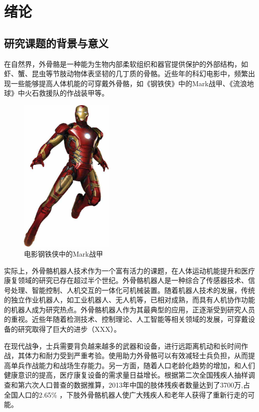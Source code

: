 \chapter{绪论}
\section{研究课题的背景与意义}
在自然界，外骨骼是一种能为生物内部柔软组织和器官提供保护的外部结构，如虾、蟹、昆虫等节肢动物体表坚韧的几丁质的骨骼。近些年的科幻电影中，频繁出现一些能够提高人体机能的可穿戴外骨骼，如《钢铁侠》中的Mark战甲、《流浪地球》中火石救援队的作战装甲等。

\begin{figure}[htb]
    \includegraphics[width=4.5cm]{fig/p2_mark.jpg}
    \caption{电影钢铁侠中的Mark战甲}
    \label{fig:mark}
\end{figure}

实际上，外骨骼机器人技术作为一个富有活力的课题，在人体运动机能提升\cite{p1}和医疗康复\cite{p2}领域的研究已存在超过半个世纪。外骨骼机器人是一种综合了传感器技术、信号处理、智能控制、人机交互的一体化可机械装置。随着机器人技术的发展，传统的独立作业机器人，如工业机器人、无人机等，已相对成熟，而具有人机协作功能的机器人成为研究热点。外骨骼机器人作为其最典型的应用，正逐渐受到研究人员的重视。近些年随着检测技术、控制理论、人工智能等相关领域的发展，可穿戴设备的研究取得了巨大的进步（XXX）。

在现代战争，士兵需要背负越来越多的武器和设备，进行远距离机动和长时间作战，其体力和耐力受到严重考验。使用助力外骨骼可以有效减轻士兵负担，从而提高单兵作战能力和战场生存能力。另一方面，随着人口老龄化趋势的增加，和人们健康意识的提高，医疗康复设备的需求量日益增长。根据第二次全国残疾人抽样调查和第六次人口普查的数据推算，2013年中国的肢体残疾者数量达到了3700万,占全国人口的2.65\% \cite{p3}，下肢外骨骼机器人使广大残疾人和老年人获得了重新行走的可能。

